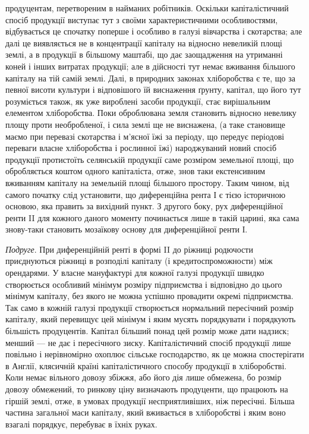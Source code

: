 \parcont{}  %
продуцентам, перетвореним в найманих робітників. Оскільки капіталістичний
спосіб продукції виступає тут з своїми характеристичними особливостями,
відбувається це спочатку поперше і особливо в галузі вівчарства і скотарства;
але далі це виявляється не в концентрації капіталу на відносно невеликій
площі землі, а в продукції в більшому маштабі, що дає заощадження на
утриманні коней і інших витратах продукції; але в дійсності тут немає вживання
більшого капіталу на тій самій землі. Далі, в природних законах хліборобства
є те, що за певної висоти культури і відповішого їй виснаження
ґрунту, капітал, що його тут розуміється також, як уже вироблені засоби
продукції, стає вирішальним елементом хліборобства. Поки оброблювана
земля становить відносно невелику площу проти необробленої, і сила землі ще
не виснажена, (а таке становище маємо при перевазі скотарства і м’ясної їжі
за періоду, що передує періодові переваги власне хліборобства і рослинної їжі)
народжуваний новий спосіб продукції протистоїть селянській продукції саме розміром
земельної площі, що обробляється коштом одного капіталіста, отже, знов таки
екстенсивним вживанням капіталу на земельній площі більшого простору. Таким
чином, від самого початку слід установити, що диференційна рента І є тією
історичною основою, яка править за вихідний пункт. З другого боку, рух диференційної
ренти II для кожного даного моменту починається лише в такій царині,
яка сама знову-таки становить мозаїкову основу для диференційної ренти І.

\emph{Подруге}. При диференційній ренті в формі II до ріжниці родючости приєднуються
ріжниці в розподілі капіталу (і кредитоспроможности) між орендарями.
У власне мануфактурі для кожної галузі продукції швидко створюється особливий
мінімум розміру підприємства і відповідно до цього мінімум капіталу,
без якого не можна успішно провадити окремі підприємства. Так само в кожній
галузі продукції створюється нормальний пересічний розмір капіталу, який
перевищує цей мінімум і яким мусять порядкувати і порядкують більшість продуцентів.
Капітал більший понад цей розмір може дати надзиск; менший — не
дає і пересічного зиску. Капіталістичний спосіб продукції лише повільно і нерівномірно
охоплює сільське господарство, як це можна спостерігати в Англії,
клясичній країні капіталістичного способу продукції в хліборобстві. Коли немає
вільного довозу збіжжя, або його дія лише обмежена, бо розмір довозу обмежений,
то ринкову ціну визначають продуценти, що працюють на гіршій землі,
отже, в умовах продукції несприятливіших, ніж пересічні. Більша частина загальної
маси капіталу, який вживається в хліборобстві і яким воно взагалі
порядкує, перебуває в їхніх руках.

